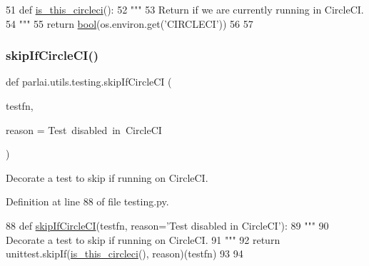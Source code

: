 \begin{DoxyCode}
51 \textcolor{keyword}{def }\hyperlink{namespaceparlai_1_1utils_1_1testing_a2b1aba8cb2afc498691840f4b8999420}{is\_this\_circleci}():
52     \textcolor{stringliteral}{"""}
53 \textcolor{stringliteral}{    Return if we are currently running in CircleCI.}
54 \textcolor{stringliteral}{    """}
55     \textcolor{keywordflow}{return} \hyperlink{namespaceprojects_1_1mastering__the__dungeon_1_1mturk_1_1tasks_1_1MTD_1_1run_a6fc0c9b519a36f82b65bcd398f1fbb9d}{bool}(os.environ.get(\textcolor{stringliteral}{'CIRCLECI'}))
56 
57 
\end{DoxyCode}
\mbox{\label{namespaceparlai_1_1utils_1_1testing_a056ab7a9ad687500924a29001a7d9264}} 
\subsubsection{\texorpdfstring{skip\+If\+Circle\+C\+I()}{skipIfCircleCI()}}
{\footnotesize\ttfamily def parlai.\+utils.\+testing.\+skip\+If\+Circle\+CI (\begin{DoxyParamCaption}\item[{}]{testfn,  }\item[{}]{reason = {\ttfamily \textquotesingle{}Test~disabled~in~CircleCI\textquotesingle{}} }\end{DoxyParamCaption})}

\begin{DoxyVerb}Decorate a test to skip if running on CircleCI.
\end{DoxyVerb}
 

Definition at line 88 of file testing.\+py.


\begin{DoxyCode}
88 \textcolor{keyword}{def }\hyperlink{namespaceparlai_1_1utils_1_1testing_a056ab7a9ad687500924a29001a7d9264}{skipIfCircleCI}(testfn, reason='Test disabled in CircleCI'):
89     \textcolor{stringliteral}{"""}
90 \textcolor{stringliteral}{    Decorate a test to skip if running on CircleCI.}
91 \textcolor{stringliteral}{    """}
92     \textcolor{keywordflow}{return} unittest.skipIf(\hyperlink{namespaceparlai_1_1utils_1_1testing_a2b1aba8cb2afc498691840f4b8999420}{is\_this\_circleci}(), reason)(testfn)
93 
94 
\end{DoxyCode}
\mbox{\label{namespaceparlai_1_1utils_1_1testing_a2d3bb5013e210bf866032aedc812859b}} 
